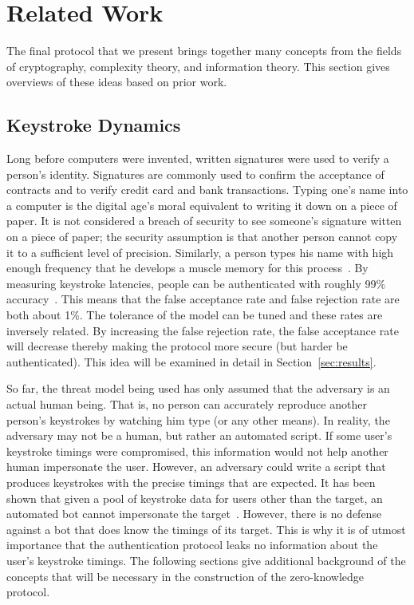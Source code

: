 \documentclass[11pt]{article}
\begin{document}
\section{Related Work}
\label{sec:related}
The final protocol that we present brings together many concepts from the fields of cryptography, complexity theory, and information theory. This section gives overviews of these ideas based on prior work.

\subsection{Keystroke Dynamics}
\label{sec:bg-keystroke}
Long before computers were invented, written signatures were used to verify a person's identity. Signatures are commonly used to confirm the acceptance of contracts and to verify credit card and bank transactions. Typing one's name into a computer is the digital age's moral equivalent to writing it down on a piece of paper. It is not considered a breach of security to see someone's signature witten on a piece of paper; the security assumption is that another person cannot copy it to a sufficient level of precision. Similarly, a person types his name with high enough frequency that he develops a muscle memory for this process~\cite{monrose:authentication}. By measuring keystroke latencies, people can be authenticated with roughly 99\% accuracy~\cite{Araujo:2005:UAT:2197882.2199456}. This means that the false acceptance rate and false rejection rate are both about 1\%. The tolerance of the model can be tuned and these rates are inversely related.  By increasing the false rejection rate, the false acceptance rate will decrease thereby making the protocol more secure (but harder be authenticated). This idea will be examined in detail in Section~\ref{sec:results}.

So far, the threat model being used has only assumed that the adversary is an actual human being. That is, no person can accurately reproduce another person's keystrokes by watching him type (or any other means). In reality, the adversary may not be a human, but rather an automated script. If some user's keystroke timings were compromised, this information would not help another human impersonate the user. However, an adversary could write a script that produces keystrokes with the precise timings that are expected. It has been shown that given a pool of keystroke data for users other than the target, an automated bot cannot impersonate the target~\cite{conf/colcom/StefanY10}. However, there is no defense against a bot that does know the timings of its target. This is why it is of utmost importance that the authentication protocol leaks no information about the user's keystroke timings. The following sections give additional background of the concepts that will be necessary in the construction of the zero-knowledge protocol.
\end{document}
